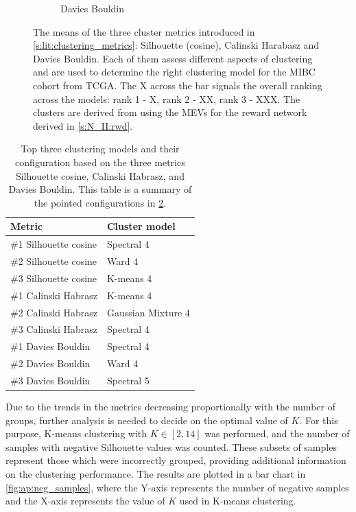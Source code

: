 \begin{figure}[H]
\begin{subfigure}[!t]{1.0\textwidth}
        \caption{Davies Bouldin}
        \label{fig:ap:n_II:dav_boul}
    \end{subfigure}
    \caption{The means of the three cluster metrics introduced in \cref{s:lit:clustering_metrics}: Silhouette (cosine), Calinski Harabasz and Davies Bouldin. Each of them assess different aspects of clustering and are used to determine the right clustering model for the MIBC cohort from TCGA. The X across the bar signals the overall ranking across the models: rank 1 - X, rank 2 - XX, rank 3 - XXX. The clusters are derived from using the MEVs for the reward network derived in \cref{s:N_II:rwd}.}
    \label{fig:ap:n_II:cluster_metrics}
\end{figure}


\begin{table}[h!]
    \centering
    \begin{tabular}{|p{6cm}|p{6cm}|}
        \hline
        \textbf{Metric} & \textbf{Cluster model} \\
        \hline
        \#1 Silhouette cosine & \rule{0pt}{2.5ex} Spectral 4 \\
        \hline
        \#2 Silhouette cosine & \rule{0pt}{2.5ex} Ward 4 \\
        \hline
        \#3 Silhouette cosine & \rule{0pt}{2.5ex} K-means 4 \\
        \hline
        \#1 Calinski Habrasz & \rule{0pt}{2.5ex} K-means 4 \\
        \hline
        \#2 Calinski Habrasz & \rule{0pt}{2.5ex} Gaussian Mixture 4 \\
        \hline
        \#3 Calinski Habrasz & \rule{0pt}{2.5ex} Spectral 4 \\
        \hline
        \#1 Davies Bouldin & \rule{0pt}{2.5ex} Spectral 4 \\
        \hline
        \#2 Davies Bouldin & \rule{0pt}{2.5ex} Ward 4 \\
        \hline
        \#3 Davies Bouldin & \rule{0pt}{2.5ex} Spectral 5 \\
        \hline
    \end{tabular}
    \caption{Top three clustering models and their configuration based on the three metrics Silhouette cosine, Calinski Habrasz, and Davies Bouldin. This table is a summary of the pointed configurations in \cref{fig:ap:n_II:cluster_metrics}.}
    \label{tab:ap:N:II:top_3_cs}
\end{table}

Due to the trends in the metrics decreasing proportionally with the number of groups, further analysis is needed to decide on the optimal value of $K$. For this purpose, K-means clustering with $K \in [2,14]$ was performed, and the number of samples with negative Silhouette values was counted. These subsets of samples represent those which were incorrectly grouped, providing additional information on the clustering performance. The results are plotted in a bar chart in \cref{fig:ap:neg_samples}, where the Y-axis represents the number of negative samples and the X-axis represents the value of $K$ used in K-means clustering.


